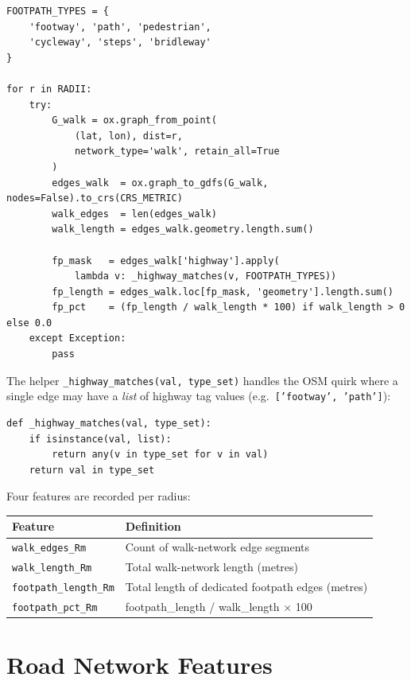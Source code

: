 \documentclass[11pt,a4paper,openany]{book}
\begin{document}
\begin{lstlisting}[style=python, caption={Walking network computation per radius.}]
FOOTPATH_TYPES = {
    'footway', 'path', 'pedestrian',
    'cycleway', 'steps', 'bridleway'
}

for r in RADII:
    try:
        G_walk = ox.graph_from_point(
            (lat, lon), dist=r,
            network_type='walk', retain_all=True
        )
        edges_walk  = ox.graph_to_gdfs(G_walk, nodes=False).to_crs(CRS_METRIC)
        walk_edges  = len(edges_walk)
        walk_length = edges_walk.geometry.length.sum()

        fp_mask   = edges_walk['highway'].apply(
            lambda v: _highway_matches(v, FOOTPATH_TYPES))
        fp_length = edges_walk.loc[fp_mask, 'geometry'].length.sum()
        fp_pct    = (fp_length / walk_length * 100) if walk_length > 0 else 0.0
    except Exception:
        pass
\end{lstlisting}

The helper \texttt{\_highway\_matches(val, type\_set)} handles the OSM quirk where a single edge may have a \emph{list} of highway tag values (e.g.\ \texttt{['footway', 'path']}):

\begin{lstlisting}[style=python, caption={OSM list-value helper.}]
def _highway_matches(val, type_set):
    if isinstance(val, list):
        return any(v in type_set for v in val)
    return val in type_set
\end{lstlisting}

Four features are recorded per radius:

\begin{center}
\begin{tabular}{L{5cm} L{8cm}}
\toprule
\textbf{Feature} & \textbf{Definition} \\
\midrule
\texttt{walk\_edges\_Rm}      & Count of walk-network edge segments \\
\texttt{walk\_length\_Rm}     & Total walk-network length (metres) \\
\texttt{footpath\_length\_Rm} & Total length of dedicated footpath edges (metres) \\
\texttt{footpath\_pct\_Rm}    & footpath\_length / walk\_length $\times$ 100 \\
\bottomrule
\end{tabular}
\end{center}

\section{Road Network Features}
\end{document}

